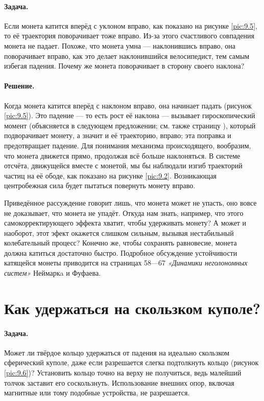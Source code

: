 \paragraph{Задача.}
Если монета катится вперёд с уклоном вправо, как показано на рисунке \ref{pic:9.5}, то её траектория поворачивает тоже вправо.
Из-за этого счастливого совпадения монета не падает.
Похоже, что монета умна --- наклонившись вправо, она поворачивает вправо, как это делает наклонившийся велосипедист, тем самым избегая падения.
Почему же монета поворачивает в сторону своего наклона?

\paragraph{Решение.}
Когда монета катится вперёд с наклоном вправо,
она начинает падать (рисунок \ref{pic:9.5}).
Это падение --- то есть рост её наклона ---
вызывает гироскопический момент (объясняется в следующем предложении;
см. также страницу \pageref{Антигравитационное велоколесо:Ответ}),
который подворачивает монету, а значит и её траекторию, вправо; эта поправка и предотвращает падение.
Для понимания механизма происходящего, вообразим, что монета движется прямо, продолжая всё больше наклоняться.
В системе отсчёта, движущейся вместе с монетой, мы бы наблюдали изгиб траекторий частиц на её ободе, как показано
на рисунке \ref{pic:9.2}.
Возникающая центробежная сила будет пытаться повернуть монету вправо.

Приведённое рассуждение говорит лишь, что монета может не упасть, оно вовсе не доказывает, что монета не упадёт.
Откуда нам знать, например, что этого самокорректирующего эффекта хватит, чтобы удерживать монету?
А может и наоборот, этот эфект окажется слишком сильным, вызывая нестабильный колебательный процесс?
Конечно же, чтобы сохранять равновесие, монета должна катиться достаточно быстро.
Подробное обсуждение устойчивости катящейся монеты приводится на страницах 58---67 \emph{«Динамики неголономных систем»} Неймаркa и Фуфаева.

\section{Как удержаться на скользком куполе?}\label{Как удержаться на скользком куполе?}

\paragraph{Задача.}
Может ли твёрдое кольцо удержаться от падения на идеально скользком сферический куполе, даже если разрешается слегка подтолкнуть кольцо (рисунок \ref{pic:9.6})?
Установить кольцо точно на верху не получиться, ведь малейший толчок заставит его соскользнуть.
Использование внешних опор, включая магнитные или тому подобные устройства, не разрешается.

